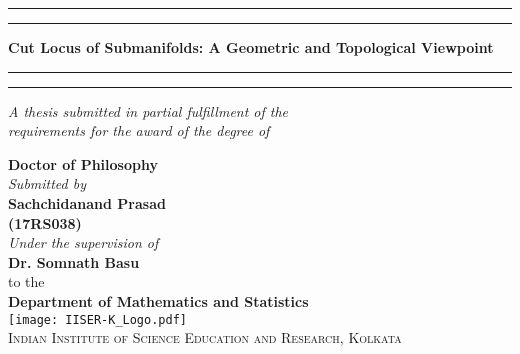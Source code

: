 \begin{titlepage}
	\centering %
	
	
	\vspace*{\baselineskip} %
	
	
	\rule{\textwidth}{1.6pt}\vspace*{-\baselineskip}\vspace*{2pt} %
	\rule{\textwidth}{0.4pt} %
	
	\vspace{0.75\baselineskip} %
	\Large \textbf {Cut Locus of Submanifolds: A Geometric and Topological Viewpoint}
		\vspace{0.75\baselineskip} %
	
	\rule{\textwidth}{0.4pt}\vspace*{-\baselineskip}\vspace{3.2pt} %
	\rule{\textwidth}{1.6pt} %
	
	\vspace{2\baselineskip} %
	
	
	\small \emph{A thesis submitted in partial fulfillment of the\\
		requirements for the award of the degree of}
	\vspace{.2in}
	
	{\bf Doctor of Philosophy }\\[0.2in]
	
	\emph{ Submitted by} \\[0.1cm]
	\textbf{ Sachchidanand Prasad\\[0.2mm] (17RS038)}\\[0.2in]
	
	\emph{ Under the supervision of}\\[0.1cm]
	{\textbf{Dr. Somnath Basu}}\\[0.3in]
	to the\\[0.1in]
	\textbf{\Large{Department of Mathematics and Statistics}}\\[2in]
	\texttt{[image: IISER-K\_Logo.pdf]}\\[0.5in]
	\normalsize
	\textsc{Indian Institute of Science Education and Research, Kolkata}
\end{titlepage}	